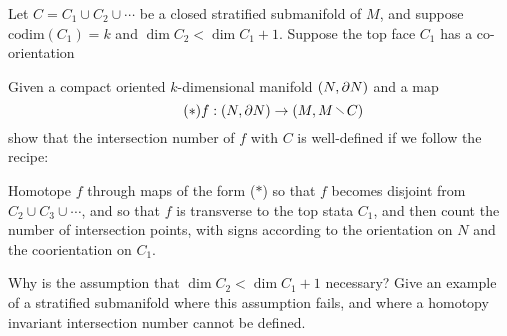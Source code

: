 \begin{xca}
  Let $C=C_{1}\cup C_{2}\cup \cdots$ be a closed stratified
  submanifold of $M$, and suppose $\text{codim}(C_{1})=k$ and
  $\dim C_{2}<\dim C_{1}+1$. Suppose the top face $C_{1}$ has a
  co-orientation

  Given a compact oriented $k$-dimensional manifold $(N,\partial N)$ and a map
  \begin{equation*}\tag{$\ast$}
    f:(N,\bd N)\to (M,M\setminus C)
  \end{equation*}
  show that the intersection number of $f$ with $C$ is well-defined if
  we follow the recipe:

  Homotope $f$ through maps of the form ($\ast$) so that $f$
  becomes disjoint from $C_{2}\cup C_{3}\cup \cdots$, and so that $f$
  is transverse to the top stata $C_{1}$, and then count the number of
  intersection points, with signs according to the orientation on $N$
  and the coorientation on $C_{1}$.

  Why is the assumption that $\dim C_{2}<\dim C_{1}+1$ necessary? Give
  an example of a stratified submanifold where this assumption fails,
  and where a homotopy invariant intersection number cannot be defined.
\end{xca}

